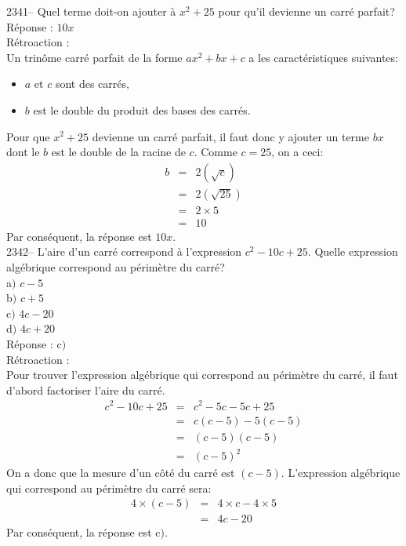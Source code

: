 \documentclass[letterpaper, 12pt]{article}
\begin{document}
2341-- Quel terme doit-on ajouter \`a $x^{2}+25$ pour qu'il devienne un carr\'e parfait?\\

R\'eponse : $10x$\\

R\'etroaction :\\
Un trin\^ome carr\'e parfait de la forme $ax^{2}+bx+c$ a les caract\'eristiques suivantes:
\begin{itemize}
\item $a$ et $c$ sont des carr\'es,
\item $b$ est le double du produit des bases des carr\'es.\\
\end{itemize}
Pour que $x^{2}+25$ devienne un carr\'e parfait, il faut donc y ajouter un terme $bx$ dont le $b$ est le double de la racine de $c$. Comme $c=25$, on a ceci:
\begin{eqnarray*}
b&=&2(\sqrt{c})\\
&=&2(\sqrt{25})\\
&=&2\times 5\\
&=&10
\end{eqnarray*}
Par cons\'equent, la r\'eponse est $10x$.\\


2342-- L'aire d'un carr\'e correspond \`a l'expression $c^{2}-10c+25$. Quelle expression alg\'ebrique correspond au p\'erim\`etre du carr\'e?\\

a$)$ $c-5$\\
b$)$ $c+5$\\
c$)$ $4c-20$\\
d$)$ $4c+20$\\

R\'eponse : c$)$\\

R\'etroaction :\\
Pour trouver l'expression alg\'ebrique qui correspond au p\'erim\`etre du carr\'e, il faut d'abord factoriser l'aire du carr\'e.
\begin{eqnarray*}
c^{2}-10c+25&=&c^{2}-5c-5c+25\\
&=&c(c-5)-5(c-5)\\
&=&(c-5)(c-5)\\
&=&(c-5)^{2}
\end{eqnarray*}
On a donc que la mesure d'un c\^ot\'e du carr\'e est $(c-5)$. L'expression alg\'ebrique qui correspond au p\'erim\`etre du carr\'e sera:
\begin{eqnarray*}
4\times (c-5)&=& 4\times c -4\times 5\\
 &=& 4c -20
\end{eqnarray*}
Par cons\'equent, la r\'eponse est c$)$.\\
\end{document}
